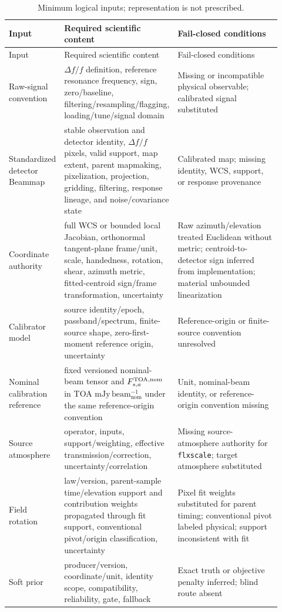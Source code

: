 \documentclass[10pt]{article}
\begin{document}
\begin{longtable}{L{0.20\linewidth}L{0.34\linewidth}L{0.38\linewidth}}
\caption{Minimum logical inputs; representation is not prescribed.}\label{tab:inputs}\\
\toprule Input & Required scientific content & Fail-closed conditions \\
\midrule
\endfirsthead
\toprule Input & Required scientific content & Fail-closed conditions \\
\midrule
\endhead
Raw-signal convention & $\Delta f/f$ definition, reference resonance frequency, sign, zero/baseline, filtering/resampling/flagging, loading/tune/signal domain & Missing or incompatible physical observable; calibrated signal substituted \\
Standardized detector Beammap & stable observation and detector identity, $\Delta f/f$ pixels, valid support, map extent, parent mapmaking, pixelization, projection, gridding, filtering, response lineage, and noise/covariance state & Calibrated map; missing identity, WCS, support, or response provenance \\
Coordinate authority & full WCS or bounded local Jacobian, orthonormal tangent-plane frame/unit, scale, handedness, rotation, shear, azimuth metric, fitted-centroid sign/frame transformation, uncertainty & Raw azimuth/elevation treated Euclidean without metric; centroid-to-detector sign inferred from implementation; material unbounded linearization \\
Calibrator model & source identity/epoch, passband/spectrum, finite-source shape, zero-first-moment reference origin, uncertainty & Reference-origin or finite-source convention unresolved \\
Nominal calibration reference & fixed versioned nominal-beam tensor and $F^{\rm TOA,nom}_{s,a}$ in TOA $\mathrm{mJy\,beam_{nom}^{-1}}$ under the same reference-origin convention & Unit, nominal-beam identity, or reference-origin convention missing \\
Source atmosphere & operator, inputs, support/weighting, effective transmission/correction, uncertainty/correlation & Missing source-atmosphere authority for \texttt{flxscale}; target atmosphere substituted \\
Field rotation & law/version, parent-sample time/elevation support and contribution weights propagated through fit support, conventional pivot/origin classification, uncertainty & Pixel fit weights substituted for parent timing; conventional pivot labeled physical; support inconsistent with fit \\
Soft prior & producer/version, coordinate/unit, identity scope, compatibility, reliability, gate, fallback & Exact truth or objective penalty inferred; blind route absent \\
\bottomrule
\end{longtable}
\end{document}
